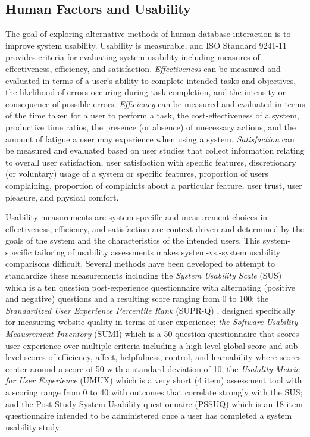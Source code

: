 \subsection{Human Factors and Usability}

The goal of exploring alternative methods of human database interaction is to improve system usability. 
Usability is measurable, and ISO Standard 9241-11 provides criteria for evaluating system usability \cite{10.1007/978-3-319-39510-4_25, 10.1016/S0306-4379(00)00015-6, iso-usability} including measures of effectiveness, efficiency, and satisfaction. 
\textit{Effectiveness} can be measured and evaluated in terms of a user's ability to complete intended tasks and objectives, the likelihood of errors occuring during task completion, and the intensity or consequence of possible errors. 
\textit{Efficiency} can be measured and evaluated in terms of the time taken for a user to perform a task, the cost-effectiveness of a system, productive time ratios, the presence (or absence) of unecessary actions, and the amount of fatigue a user may experience when using a system. 
\textit{Satisfaction} can be measured and evaluated based on user studies that collect information relating to overall user satisfaction, user satisfaction with specific features, discretionary (or voluntary) usage of a system or specific features, proportion of users complaining, proportion of complaints about a particular feature, user trust, user pleasure, and physical comfort.

Usability measurements are system-specific and measurement choices in effectiveness, efficiency, and satisfaction are context-driven and determined by the goals of the system and the characteristics of the intended users. 
This system-specific tailoring of usability assessments makes system-vs.-system usability comparisons difficult. 
Several methods have been developed to attempt to standardize these measurements including the \emph{System Usability Scale} (SUS) \cite{sus-retrospective} which is a ten question post-experience questionnaire with alternating (positive and negative) questions and a resulting score ranging from 0 to 100; the \emph{Standardized User Experience Percentile Rank} (SUPR-Q) \cite{suprq}, designed specifically for measuring website quality in terms of user experience; \emph{the Software Usability Meausrement Inventory} (SUMI) \cite{sumi} which is a 50 question questionnaire that scores user experience over multiple criteria including a high-level global score and sub-level scores of efficiency, affect, helpfulness, control, and learnability where scores center around a score of 50 with a standard deviation of 10; the \emph{Usability Metric for User Experience} (UMUX) \cite{10.1016/j.intcom.2010.04.004} which is a very short (4 item) assessment tool with a scoring range from 0 to 40 with outcomes that correlate strongly with the SUS; and the Post-Study System Usability questionnaire (PSSUQ) \cite{pssuq} which is an 18 item questionnaire intended to be administered once a user has completed a system usability study.

